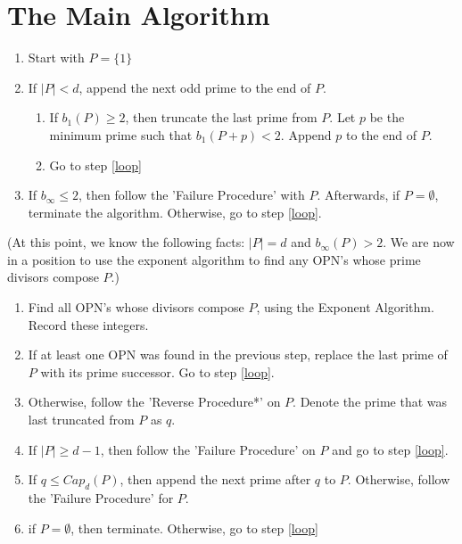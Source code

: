 \documentclass[../paper.tex]{subfiles}
\begin{document}
\section{The Main Algorithm}

\begin{enumerate}[label*=\arabic*.]
  
  \item Start with $P = \{1\}$

  \item If $|P| < d$, append the next odd prime to the end of
    $P$. \label{loop}

  \begin{enumerate}[label*=\arabic*.]

    \item If $b_{1}(P) \geq 2$, then truncate the last prime
      from $P$. Let $p$ be the minimum prime such that $b_{1}(P +
      p) < 2$. Append $p$ to the end of $P$. 

    \item Go to step {\ref{loop}}

  \end{enumerate}

  \item If $b_{\infty} \leq 2$, then follow the 'Failure
        Procedure' with $P$. Afterwards, if $P = \emptyset$,
        terminate the algorithm. Otherwise, go to step
        {\ref{loop}}.

\end{enumerate}

(At this point, we know the following facts: $|P| = d$ and
$b_{\infty}(P) > 2$. We are now in a position to use the exponent
algorithm to find any OPN's whose prime divisors compose $P$.)

\begin{enumerate}[resume]  

  \item Find all OPN's whose divisors compose $P$, using the
        Exponent Algorithm. Record these integers.

  \item If at least one OPN was found in the previous step,
        replace the last prime of $P$ with its prime successor.
        Go to step {\ref{loop}}. 

  \item Otherwise, follow the 'Reverse Procedure*' on $P$. Denote
        the prime that was last truncated from $P$ as $q$. 
        
  \item If $|P| \geq d - 1$, then follow the 'Failure Procedure'
        on $P$ and go to step {\ref{loop}}.

  \item If $q \leq Cap_d(P)$, then append the next prime after $q$
        to $P$. Otherwise, follow the 'Failure Procedure' for $P$.

  \item if $P = \emptyset$, then terminate. Otherwise, go to step
        {\ref{loop}}
\end{enumerate}
\end{document}
